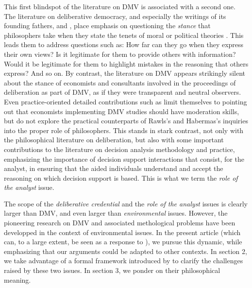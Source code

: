 \documentclass[version=3.21, pagesize, twoside=off, bibliography=totoc, DIV=calc, fontsize=12pt, a4paper, french, english]{scrartcl}
\begin{document}
This first blindspot of the literature on \ac{DMV} is associated with a second one. The literature on deliberative democracy, and especially the writings of its founding fathers, \citet{rawls_political_2005} and \citet{habermas_faktizitat_1992}, place emphasis on questioning the \emph{stance} that philosophers take when they state the tenets of moral or political theories \citep{meinard_du_2014}. This leads them to address questions such as: How far can they go when they express their own views? Is it legitimate for them to provide others with information? Would it be legitimate for them to highlight mistakes in the reasoning that others express? And so on.
By contrast, the literature on \ac{DMV} appears strikingly silent about the stance of economists and consultants involved in the proceedings of deliberation as part of \ac{DMV}, as if they were transparent and neutral observers. Even practice-oriented detailed contributions such as \citet{schaafsma_guidance_2018} limit themselves to pointing out that economists implementing \ac{DMV} studies should have moderation skills, but do not explore the practical counterparts of Rawls’s and Habermas’s inquiries into the proper role of philosophers. 
This stands in stark contrast, not only with the philosophical literature on deliberation, but also with some important contributions to the literature on decision analysis methodology and practice, emphasizing the importance of decision support interactions that consist, for the analyst, in ensuring that the aided individuals understand and accept the reasoning on which decision support is based. 
This is what we term the \emph{role of the analyst} issue.

The scope of the \emph{deliberative credential} and the \emph{role of the analyst} issues is clearly larger than \ac{DMV}, and even larger than \emph{environmental} issues. 
However, the pioneering research on \ac{DMV} and associated methological problems have been developped in the context of environmental issues. 
In the present article (which can, to a large extent, be seen as a response to \citet{bartkowski_beyond_2018}), we pursue this dynamic, while emphasizing that our arguments could be adapted to other contexts. In section 2, we take advantage of a formal framework introduced by \citet{cailloux_formal_2019} to clarify the challenges raised by these two issues.
In section 3, we ponder on their philosophical meaning.
\end{document}
